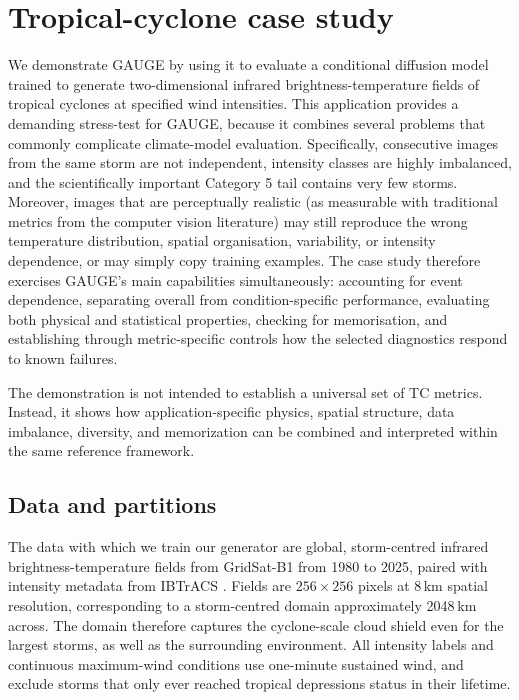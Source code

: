 \documentclass[gmd, manuscript]{copernicus}
\begin{document}
\section{Tropical-cyclone case study}
\label{sec:tc}

We demonstrate GAUGE by using it to evaluate a conditional diffusion model trained to
generate two-dimensional infrared brightness-temperature fields of tropical cyclones
at specified wind intensities. This application provides a demanding stress-test for GAUGE, because it combines several problems that commonly complicate climate-model evaluation. Specifically, consecutive images from the same storm are not independent, intensity classes are highly imbalanced, and the scientifically important Category 5 tail contains very few storms. Moreover, images that are perceptually realistic (as measurable with traditional metrics from the computer vision literature) may still reproduce the wrong temperature distribution, spatial organisation, variability, or intensity dependence, or may simply copy training examples. The case study therefore exercises GAUGE's main capabilities simultaneously: accounting for event dependence, separating overall from condition-specific performance, evaluating both physical and statistical properties, checking for memorisation, and establishing through metric-specific controls how the selected diagnostics respond to known failures.


The demonstration is not intended to establish a
universal set of TC metrics. Instead, it shows how application-specific physics,
spatial structure, data imbalance, diversity, and memorization can be combined and
interpreted within the same reference framework.

\subsection{Data and partitions}

The data with which we train our generator are global, storm-centred infrared brightness-temperature fields from
GridSat-B1 \citep{Knapp2011} from 1980 to 2025, paired with intensity metadata from IBTrACS
\citep{Knapp2010}. Fields are \(256\times256\) pixels at 8\,km spatial resolution, corresponding to a storm-centred domain approximately 2048 km across. The domain therefore captures the cyclone-scale cloud shield even for the largest storms, as  well as the surrounding environment. All intensity
labels and continuous maximum-wind conditions use one-minute sustained wind, and exclude storms that only ever reached tropical depressions status in their lifetime.
\end{document}
